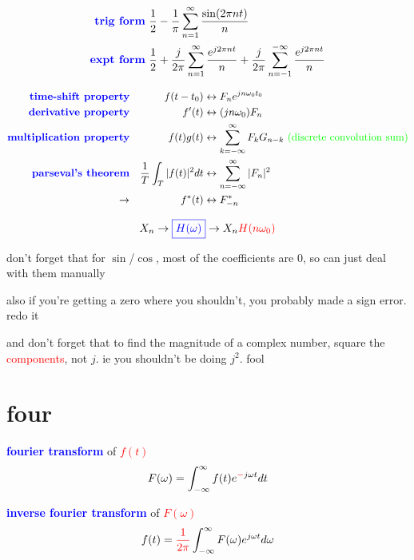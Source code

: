\documentclass[a5paper, fleqn]{article}
\newcommand{\vocab}[1]{\textbf{\textcolor{blue}{#1}}}
\newcommand{\emf}[1]{\textcolor{red}{#1}}
\newcommand{\note}[1]{\textcolor{green}{#1}}
\newcommand{\eq}[1]{\textcolor{red}{$#1$}}
\newcommand{\wrap}{\hangpara{0.5cm}{1}}
\begin{document}
\begin{align*}
  \vocab{trig form} & ~ \frac{1}{2} - \frac{1}{\pi} \sum_{n = 1}^\infty \frac{\sin(2\pi nt)}{n}                                                                 \\
  \vocab{expt form} & ~ \frac{1}{2} + \frac{j}{2\pi} \sum_{n = 1}^\infty \frac{e^{j2\pi nt}}{n} + \frac{j}{2\pi} \sum_{n = -1}^{-\infty} \frac{e^{j2\pi nt}}{n}
\end{align*}

\begin{align*}
  \vocab{time-shift property}     &  & f(t - t_0)                     & \leftrightarrow F_n e^{jn\omega_0 t_0}                                                             \\
  \vocab{derivative property}     &  & f^\prime(t)                    & \leftrightarrow (jn\omega_0)F_n                                                                    \\
  \vocab{multiplication property} &  & f(t) g(t)                      & \leftrightarrow \sum_{k = -\infty}^\infty F_k G_{n - k} ~ \note{\text{(discrete convolution sum)}} \\
  \vocab{parseval's theorem}      &  & \frac{1}{T} \int_T |f(t)|^2 dt & \leftrightarrow \sum_{n = -\infty}^\infty |F_n|^2                                                  \\
  \to                             &  & f^*(t)                         & \leftrightarrow F^*_{-n}
\end{align*}

\[X_n \to \vocab{$\boxed{H(\omega)}$} \to X_n \emf{H(n\omega_0)}\]

don't forget that for $\sin$/$\cos$, most of the coefficients are 0, so can just deal with them manually

also if you're getting a zero where you shouldn't, you probably made a sign error. redo it

\wrap and don't forget that to find the magnitude of a complex number, square the \emf{components}, not $j$. ie you shouldn't be doing $j^2$. fool

\section*{\textcolor{primary}{four}}

\vocab{fourier transform} of \eq{f(t)}
\[F(\omega) = \int_{-\infty}^\infty f(t) e^{\emf{-}j\omega t} dt\]

\vocab{inverse fourier transform} of \eq{F(\omega)}
\[f(t) = \emf{\frac{1}{2\pi}} \int_{-\infty}^\infty F(\omega) e^{j\omega t} d\omega\]
\end{document}

